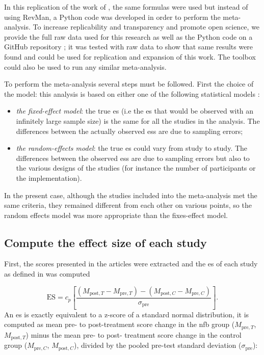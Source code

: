 \documentclass[12pt,a4paper,english]{article}
\begin{document}
In this replication of the work of \citeauthor{Cortese2016}, the same formulas were used \citep{Borenstein2009} but instead of using RevMan, 
a Python code was developed in order to perform the meta-analysis. To increase replicability and transparency and promote open science, we 
provide the full raw data used for this research as well as the Python code on a GitHub repository \citep{Bussalb2018}; it was tested
with \citet{Cortese2016} raw data to show that same results were found and could be used for replication and expansion of this work. The toolbox
could also be used to run any similar meta-analysis. 

To perform the meta-analysis several steps must be followed. First the choice of the model: this analysis is based on either one of the following 
statistical models \citep{Borenstein2009}:
\begin{itemize}
    \item \emph{the fixed-effect model}: the true \gls{es} (i.e the \gls{es} that would be observed with an infinitely 
		large sample size) is the same for all the studies in the analysis. The differences between the actually observed \gls{es}s 
		are due to sampling errors;
    \item \emph{the random-effects model}: the true \gls{es} could vary from study to study. The differences between the observed
		\glspl{es} are due to sampling errors but also to the various designs of the studies (for instance the number of participants or the implementation).
\end{itemize}

In the present case, although the studies included into the meta-analysis met the same criteria, they remained different from each other on various points,
so the random effects model was more appropriate than the fixes-effect model. 

\subsection{Compute the effect size of each study}

First, the scores presented in the articles were extracted and the \gls{es} of each study as defined in \citet{Morris2008} 
was computed 

\begin{equation}
\label{eq:metareview_effect_size}
\text{ES} = c_p \left[ \frac{(M_{\text{post},T} - M_{\text{pre},T}) - (M_{\text{post},C} - M_{\text{pre},C}) }{\sigma_{\text{pre}}} \right ].
\end{equation} 
\noindent An \gls{es} is exactly equivalent to a z-score of a standard normal distribution, it is computed as mean pre- to post-treatment 
score change in the \gls{nfb} group ($M_{\text{pre},T}$, $M_{\text{post},T}$) minus the mean pre- to post- treatment score change 
in the control group ($M_{\text{pre},C}$, $M_{\text{post},C}$), divided by the pooled pre-test standard deviation ($\sigma_{\text{pre}}$):
\end{document}

